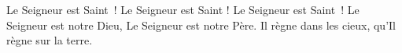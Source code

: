 Le Seigneur est Saint ! Le Seigneur est Saint ! Le Seigneur est Saint !
Le Seigneur est notre Dieu, Le Seigneur est notre Père. Il règne dans les cieux, qu’Il règne sur la terre.
